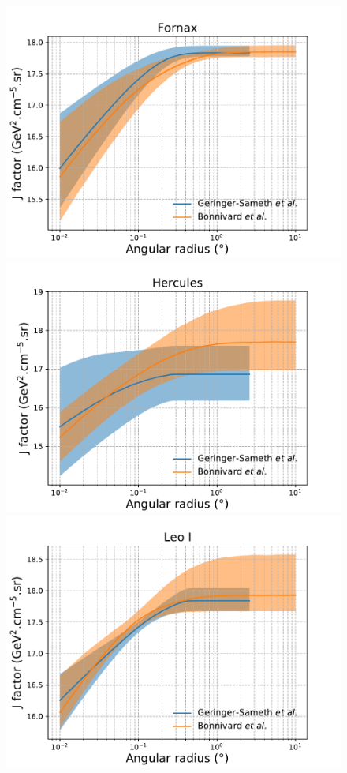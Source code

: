\begin{figure}[ht]
{    \includegraphics[scale=0.32]{figures/glory_duck/appendix/Fornax.pdf}
    \includegraphics[scale=0.32]{figures/glory_duck/appendix/Hercules.pdf}
    \includegraphics[scale=0.32]{figures/glory_duck/appendix/LeoI.pdf}
}
\end{figure}
